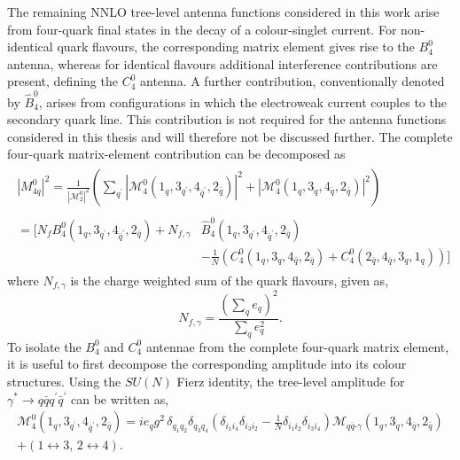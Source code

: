 The remaining NNLO tree-level antenna functions considered in this work arise
from four-quark final states in the decay of a colour-singlet current. For
non-identical quark flavours, the corresponding matrix element gives rise to
the $B_4^0$ antenna, whereas for identical flavours additional interference
contributions are present, defining the $C_4^0$ antenna. A further
contribution, conventionally denoted by $\hat B_4^0$, arises from
configurations in which the electroweak current couples to the secondary
quark line. This contribution is not required for the antenna functions
considered in this thesis and will therefore not be discussed further. The
complete four-quark matrix-element contribution can be decomposed as
\begin{equation}\label{eq:M4q}
    \begin{gathered}
        \begin{aligned}
            |M_{4q}^0|^2 = \frac1{|\mathcal M_2^0|^2}\left(\sum_{q^\prime}|\mathcal M_4^0(1_q,3_{q^\prime},4_{\bar q^\prime},2_{\bar q})|^2+|\mathcal M_4^0(1_q,3_{q},4_{\bar q},2_{\bar q})|^2\right)
        \end{aligned}\\
        \begin{aligned}
            =\Bigg[N_fB_4^0(1_q,3_{q^\prime},4_{\bar q^\prime},2_{\bar q})+N_{f,\gamma}&\hat B_4^0(1_q,3_{q^\prime},4_{\bar q^\prime},2_{\bar q})\\
                                                                                 &-\frac1N\!\left(C_4^0(1_q,3_q,4_{\bar q},2_{\bar q})+C_4^0(2_{\bar q},4_{\bar q},3_q,1_q)\right)\Bigg]
        \end{aligned}
    \end{gathered}
\end{equation}
where $N_{f,\gamma}$ is the charge weighted sum of the quark flavours, given as,
\begin{equation}
    N_{f,\gamma} = \frac{\left(\sum_q e_q\right)^2}{\sum_q e_q^2}.
\end{equation}
To isolate the $B_4^0$ and $C_4^0$ antennae from the complete four-quark
matrix element, it is useful to first decompose the corresponding amplitude
into its colour structures. Using the $SU(N)$ Fierz identity, the tree-level
amplitude for $\gamma^*\to q\bar qq^\prime\bar q^\prime$ can be written as,
\begin{equation}
    \begin{gathered}
        \mathcal M_4^0(1_q,3_{q^\prime},4_{\bar q^\prime},2_{\bar q}) = ie_qg^2\,\delta_{q_1q_2}\delta_{q_3q_4}\left(\delta_{i_1i_4}\delta_{i_3i_2}-\frac1N\delta_{i_1i_2}\delta_{i_3i_4}\right)\mathcal M_{q\bar q\text{-}\gamma}(1_q,3_q,4_{\bar q},2_{\bar q})\\
        + (1\leftrightarrow3,\,2\leftrightarrow4).
    \end{gathered}
\end{equation}
